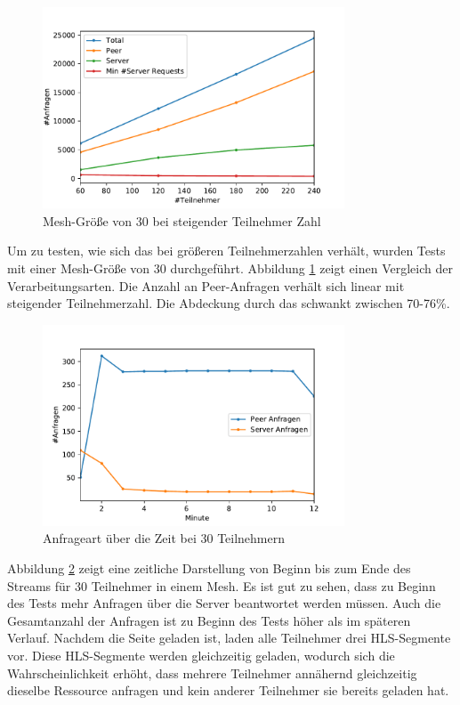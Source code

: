 \begin{figure}[!h]
	\centering
	\includegraphics[width=0.8\textwidth]{figures/meshed_30_line}
	\caption[Mesh-Größe von 30 bei steigender Teilnehmer Zahl]{Mesh-Größe von 30 bei steigender Teilnehmer Zahl}
	\label{fig:meshed_30_line}
\end{figure}

Um zu testen, wie sich das \cdn bei größeren Teilnehmerzahlen verhält, wurden Tests mit einer Mesh-Größe von 30 durchgeführt. Abbildung \ref{fig:meshed_30_line} zeigt einen Vergleich der Verarbeitungsarten. Die Anzahl an Peer-Anfragen verhält sich linear mit steigender Teilnehmerzahl. Die Abdeckung durch das \cdn schwankt zwischen 70-76\%.


\begin{figure}[!h]
	\centering
	\includegraphics[width=0.8\textwidth]{figures/peer_vs_server_over_time}
	\caption[Anfrageart über die Zeit bei 30 Teilnehmern]{Anfrageart über die Zeit bei 30 Teilnehmern}
	\label{fig:peer_vs_server_over_time}
\end{figure}

Abbildung \ref{fig:peer_vs_server_over_time} zeigt eine zeitliche Darstellung von Beginn bis zum Ende des Streams für 30 Teilnehmer in einem Mesh. Es ist gut zu sehen, dass zu Beginn des Tests mehr Anfragen über die Server beantwortet werden müssen. Auch die Gesamtanzahl der Anfragen ist zu Beginn des Tests höher als im späteren Verlauf. Nachdem die Seite geladen ist, laden alle Teilnehmer drei HLS-Segmente vor. Diese HLS-Segmente werden gleichzeitig geladen, wodurch sich die Wahrscheinlichkeit erhöht, dass mehrere Teilnehmer annähernd gleichzeitig dieselbe Ressource anfragen und kein anderer Teilnehmer sie bereits geladen hat. 

